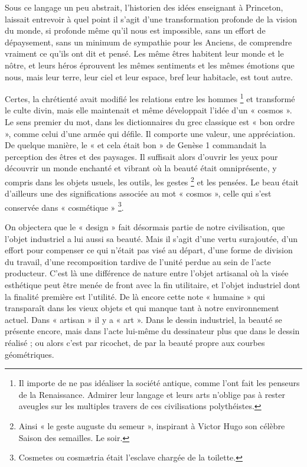 \documentclass[a4paper,12pt]{article}
\begin{document}
Sous ce langage un peu abstrait, l’historien des idées enseignant à Princeton, laissait entrevoir à quel point il s'agit d'une transformation profonde de la vision du monde, si profonde même qu'il nous est impossible, sans un effort de dépaysement, sans un minimum de sympathie pour les Anciens, de comprendre vraiment ce qu'ils ont dit et pensé. Les même êtres habitent leur monde et le nôtre, et leurs héros éprouvent les mêmes sentiments et les mêmes émotions que nous, mais leur terre, leur ciel et leur espace, bref leur habitacle, est tout autre.

Certes, la chrétienté avait modifié les relations entre les hommes \footnote{Il importe de ne pas idéaliser la société antique, comme l’ont fait les penseurs de la Renaissance. Admirer leur langage et leurs arts n’oblige pas à rester aveugles sur les multiples travers de ces civilisations polythéistes.} et transformé le culte divin, mais elle maintenait et même développait l'idée d'un « cosmos ». 
Le sens premier du mot, dans les dictionnaires du grec classique est « bon ordre », comme celui d'une armée qui défile. Il comporte une valeur, une appréciation. De quelque manière, le « et cela était bon » de Genèse 1 commandait la perception des êtres et des paysages. Il suffisait alors d'ouvrir les yeux pour découvrir un monde enchanté et vibrant où la beauté était omniprésente, y compris dans les objets usuels, les outils, les gestes \footnote{Ainsi « le geste auguste du semeur », inspirant à Victor Hugo son célèbre Saison des semailles. Le soir.} et les pensées. Le beau était d'ailleurs une des significations associée au mot « cosmos », celle qui s’est conservée dans « cosmétique » \footnote{Cosmetes ou cosmætria était l’esclave chargée de la toilette.}. 

On objectera que le « design » fait désormais partie de notre civilisation, que l'objet industriel a lui aussi sa beauté. Mais il s'agit d'une vertu surajoutée, d'un effort pour compenser ce qui n'était pas visé au départ, d’une forme de division du travail, d'une recomposition tardive de l'unité perdue au sein de l'acte producteur. C'est là une différence de nature entre l'objet artisanal où la visée esthétique peut être menée de front avec la fin utilitaire, et l’objet industriel dont la finalité première est l'utilité. De là encore cette note « humaine » qui transparaît dans les vieux objets et qui manque tant à notre environnement actuel. Dans « artisan » il y a « art ». Dans le dessin industriel, la beauté se présente encore, mais dans l’acte lui-même du dessinateur plus que dans le dessin réalisé ; ou alors c’est par ricochet, de par la beauté propre aux courbes géométriques.
\end{document}
